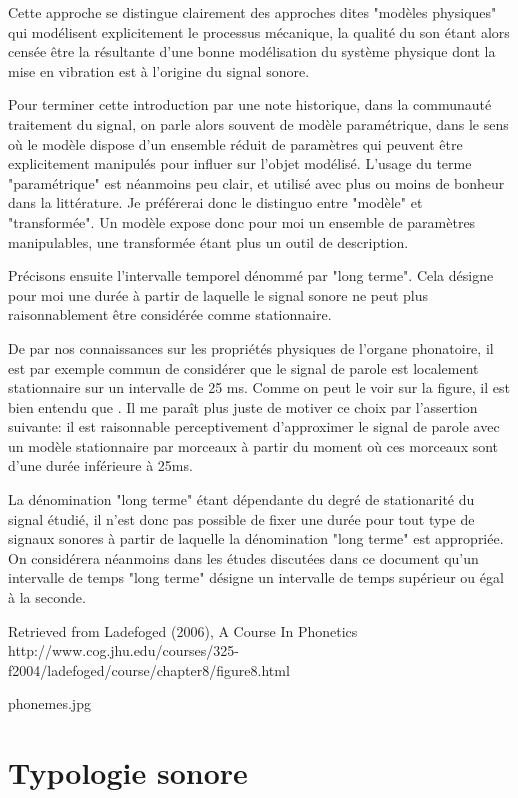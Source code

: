 Cette approche se distingue clairement des approches dites "modèles physiques" qui modélisent explicitement le processus mécanique, la qualité du son étant alors censée être la résultante d'une bonne modélisation du système physique dont la mise en vibration est à l'origine du signal sonore.

Pour terminer cette introduction par une note historique, dans la communauté traitement du signal, on parle alors souvent de modèle paramétrique, dans le sens où le modèle dispose d'un ensemble réduit de paramètres qui peuvent être explicitement manipulés pour influer sur l'objet modélisé. L'usage du terme "paramétrique" est néanmoins peu clair, et utilisé avec plus ou moins de bonheur dans la littérature. Je préférerai donc le distinguo entre "modèle" et "transformée". Un modèle expose donc pour moi un ensemble de paramètres manipulables, une transformée étant plus un outil de description.

Précisons ensuite l'intervalle temporel dénommé par "long terme". Cela désigne pour moi une durée à partir de laquelle le signal sonore ne peut plus raisonnablement être considérée comme stationnaire.

De par nos connaissances sur les propriétés physiques de l'organe phonatoire, il est par exemple commun de considérer que le signal de parole est localement stationnaire sur un intervalle de 25 ms. Comme on peut le voir sur la figure, il est bien entendu que . Il me paraît plus juste de motiver ce choix par l'assertion suivante: il est raisonnable perceptivement d'approximer le signal de parole avec un modèle stationnaire par morceaux à partir du moment où ces morceaux sont d'une durée inférieure à 25ms.

La dénomination "long terme" étant dépendante du degré de stationarité du signal étudié, il n'est donc pas possible de fixer une durée pour tout type de signaux sonores à partir de laquelle la dénomination "long terme" est appropriée. On considérera néanmoins dans les études discutées dans ce document qu'un intervalle de temps "long terme" désigne un intervalle de temps supérieur ou égal à la seconde.

Retrieved from Ladefoged (2006), A Course In Phonetics http://www.cog.jhu.edu/courses/325-f2004/ladefoged/course/chapter8/figure8.html

phonemes.jpg

\section{Typologie sonore}

